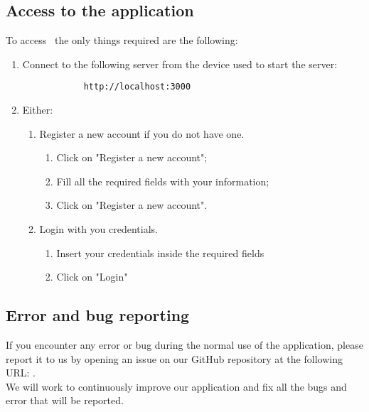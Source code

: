 \subsection{Access to the application}
To access \app\, the only things required are the following:
\begin{enumerate}
	\item Connect to the following  server from the device used to start the server:
			\begin{lstlisting}
			http://localhost:3000
			\end{lstlisting}
	\item Either:
		  \begin{enumerate}
		  	\item Register a new account if you do not have one.
		  		\begin{enumerate}
		  			\item Click on "Register a new account";
		  			\item Fill all the required fields with your information;
		  			\item Click on "Register a new account".
		  		\end{enumerate}
		  		
		  	\item Login with you credentials.
		  		\begin{enumerate}
		  			\item Insert your credentials inside the required fields
		  			\item Click on "Login"
		  		\end{enumerate}
		  \end{enumerate}
\end{enumerate}

\subsection{Error and bug reporting}
If you encounter any error or bug during the normal use of the application, please report it to us by opening an issue on our GitHub repository at the following URL: . \\
We will work to continuously improve our application and fix all the bugs and error that will be reported. 
\newpage